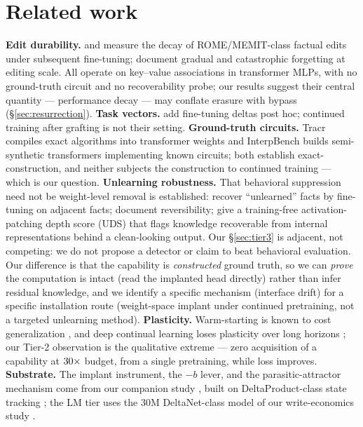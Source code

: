 \documentclass[10pt]{article}
\begin{document}
\section{Related work}
\textbf{Edit durability.} \citet{cheng2025erase} and \citet{wen2025retention} measure the decay
of ROME/MEMIT-class factual edits \citep{meng2022rome,meng2023memit} under subsequent fine-tuning;
\citet{gupta2024editing} document gradual and catastrophic forgetting at editing scale. All
operate on key--value associations in transformer MLPs, with no ground-truth circuit and no
recoverability probe; our results suggest their central quantity --- performance decay --- may
conflate erasure with bypass (\S\ref{sec:resurrection}). \textbf{Task vectors.}
\citet{ilharco2023task} add fine-tuning deltas post hoc; continued training after grafting is not
their setting. \textbf{Ground-truth circuits.} Tracr \citep{lindner2023tracr} compiles exact algorithms into
transformer weights and InterpBench \citep{gupta2024interpbench} builds semi-synthetic transformers
implementing known circuits; both establish exact-construction, and neither subjects the construction
to continued training --- which is our question. \textbf{Unlearning robustness.} That behavioral
suppression need not be weight-level removal is established: \citet{deeb2024weights} recover
``unlearned'' facts by fine-tuning on adjacent facts; \citet{xu2026reversibility} document
reversibility; \citet{lee2026uds} give a training-free activation-patching depth score (UDS) that
flags knowledge recoverable from internal representations behind a clean-looking output. Our
\S\ref{sec:tier3} is adjacent, not competing: we do not propose a detector or claim to beat
behavioral evaluation. Our difference is that the capability is \emph{constructed} ground truth, so
we can \emph{prove} the computation is intact (read the implanted head directly) rather than infer
residual knowledge, and we identify a specific mechanism (interface drift) for a specific
installation route (weight-space implant under continued pretraining, not a targeted unlearning
method).
\textbf{Plasticity.} Warm-starting is known to cost generalization \citep{ash2020warm}, and deep
continual learning loses plasticity over long horizons \citep{dohare2024plasticity}; our Tier-2
observation is the qualitative extreme --- zero acquisition of a capability at
$30\times$ budget, from a single pretraining, while loss improves. \textbf{Substrate.}
The implant instrument, the $-b$ lever, and the parasitic-attractor mechanism come from our
companion study \citep{howe2026automaton}, built on DeltaProduct-class state tracking
\citep{grazzi2025negative,siems2025deltaproduct}; the LM tier uses the 30M DeltaNet-class model of
our write-economics study \citep{howe2026hygiene}.
\end{document}
